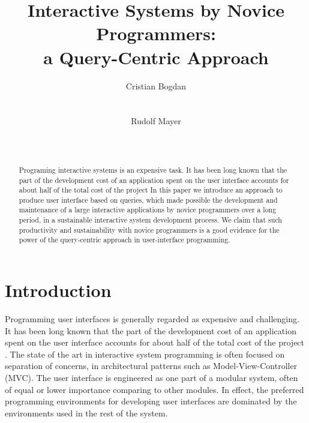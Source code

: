 \documentclass{chi2009}
\begin{document}
\title{Interactive Systems by Novice Programmers:\\ a %
Query-Centric Approach}

\author{
  \alignauthor Cristian Bogdan\\
    \\
    \\
  \alignauthor Rudolf Mayer\\
    \\
    \\
}

\maketitle
\begin{abstract}
Programing interactive systems is an expensive task. It has been long known that the part of the development cost of an application spent on the user interface accounts for 
about half
of the total cost of the project 
In this paper we introduce an approach to produce user interface based on queries, which made possible the development and maintenance of a large interactive applications by novice programmers over a long period, in 
a sustainable interactive system development process. We claim that such productivity and sustainability with novice programmers is a good evidence for the power of the query-centric approach in user-interface programming. 
\end{abstract}

\section{Introduction}\label{sec:intro}
Programming user interfaces is generally regarded as expensive and challenging.  It has been long known that the part of the development cost of an application spent on the user interface accounts for about half of the total cost of the project \cite{Myers92surveyon}. The state of the art in interactive system programming is often focused on separation of concerns, in architectural patterns such as Model-View-Controller (MVC). The user interface is engineered as one part of a modular system, often of equal or lower importance comparing to other modules. In effect, the preferred programming environments for developing user interfaces are dominated by the environments used in the rest of the system.
\end{document}
